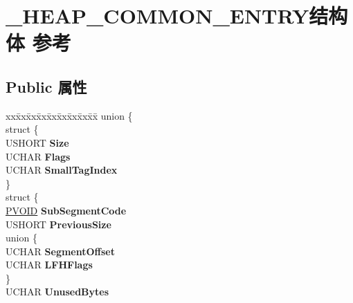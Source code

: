 \hypertarget{struct___h_e_a_p___c_o_m_m_o_n___e_n_t_r_y}{}\section{\+\_\+\+H\+E\+A\+P\+\_\+\+C\+O\+M\+M\+O\+N\+\_\+\+E\+N\+T\+R\+Y结构体 参考}
\label{struct___h_e_a_p___c_o_m_m_o_n___e_n_t_r_y}
\subsection*{Public 属性}
\begin{DoxyCompactItemize}
\item 
\mbox{\label{struct___h_e_a_p___c_o_m_m_o_n___e_n_t_r_y_a7f3efa76f3e7667f1eafdb2b4fd69eda}} 
\begin{tabbing}
xx\=xx\=xx\=xx\=xx\=xx\=xx\=xx\=xx\=\kill
union \{\\
\mbox{\label{union___h_e_a_p___c_o_m_m_o_n___e_n_t_r_y_1_1_0D3638_ab5a2b6c071c90d4738f16e171b7705d1}} 
\>struct \{\\
\>\>USHORT {\bfseries Size}\\
\>\>UCHAR {\bfseries Flags}\\
\>\>UCHAR {\bfseries SmallTagIndex}\\
\>\} \\
\mbox{\label{union___h_e_a_p___c_o_m_m_o_n___e_n_t_r_y_1_1_0D3638_a651d7352d9ce8ebce1402d23cda2cf37}} 
\>struct \{\\
\>\>\hyperlink{interfacevoid}{PVOID} {\bfseries SubSegmentCode}\\
\>\>USHORT {\bfseries PreviousSize}\\
\mbox{\label{struct___h_e_a_p___c_o_m_m_o_n___e_n_t_r_y_1_1_0D3638_1_1_0D3642_aa25ba62c258ce333b252444fee202791}} 
\>\>union \{\\
\>\>\>UCHAR {\bfseries SegmentOffset}\\
\>\>\>UCHAR {\bfseries LFHFlags}\\
\>\>\} \\
\>\>UCHAR {\bfseries UnusedBytes}\\

\end{tabbing}
\end{DoxyCompactItemize}
